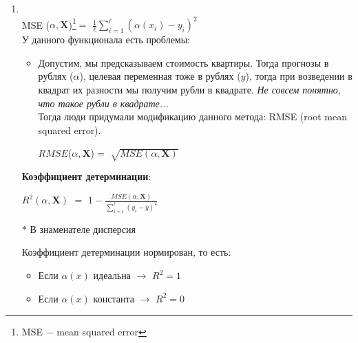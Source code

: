             \begin{enumerate}
            \item {}\\
                MSE ($\alpha, \mathbf{X}$)\footnote{MSE $-$ mean squared error}$=$ $\frac{1}{\ell} \sum\limits_{i=1}^\ell (\alpha(x_i) - y_i)^2$\\

                У данного функционала есть проблемы:
                \begin{itemize}
                    \item Допустим, мы предсказываем стоимость квартиры. Тогда прогнозы в рублях ($\alpha$), целевая переменная тоже в рублях ($y$), тогда при возведении в квадрат их разности мы получим рубли в квадрате. \textit{Не совсем понятно, что такое рубли в квадрате...}\\

                    Тогда люди придумали модификацию данного метода: RMSE (root mean squared error).

                    \begin{center}
                        $RMSE$($\alpha, \mathbf{X}$)$=$ $\sqrt{MSE(\alpha, \mathbf{X})}$
                    \end{center}
                    \end{itemize}
    
                
                    \textbf{Коэффициент детерминации}:\\
                        \begin{center}
                            \large{$R^2(\alpha, \mathbf{X})$ $=$ $1 - \frac{MSE(\alpha, \mathbf{X})}{\sum\limits_{i=1}^\ell (y_i - \bar{y})^2}$}
                            
                        \end{center}
                        \begin{center}
                             $\ast$ В знаменателе дисперсия
                        \end{center}
                    Коэффициент детерминации нормирован, то есть:
                    \begin{itemize}
                        \item Если $\alpha(x)$ идеальна $\longrightarrow$ $R^2 = 1$
                        \item Если $\alpha(x)$ константа $\longrightarrow$ $R^2 = 0$\\
                    \end{itemize}


\end{enumerate}
